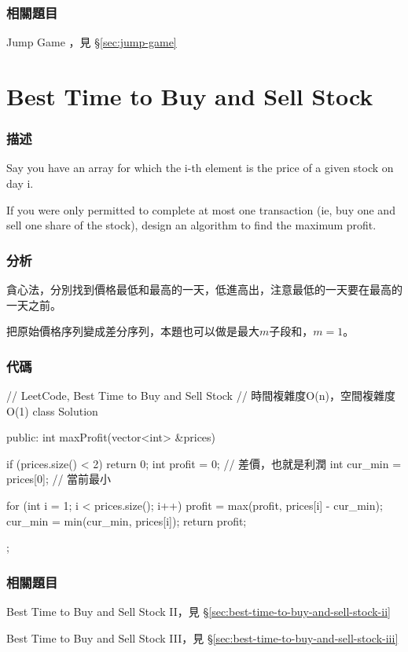\subsubsection{相關題目}
\begindot
\item Jump Game ，見 \S \ref{sec:jump-game}
\myenddot


\section{Best Time to Buy and Sell Stock} %
\label{sec:best-time-to-buy-and-sell-stock}


\subsubsection{描述}
Say you have an array for which the i-th element is the price of a given stock on day i.

If you were only permitted to complete at    most one transaction (ie, buy one and sell one share of the stock), design an algorithm to find the maximum profit.


\subsubsection{分析}
貪心法，分別找到價格最低和最高的一天，低進高出，注意最低的一天要在最高的一天之前。

把原始價格序列變成差分序列，本題也可以做是最大$m$子段和，$m=1$。

\subsubsection{代碼}
\begin{Code}
// LeetCode, Best Time to Buy and Sell Stock
// 時間複雜度O(n)，空間複雜度O(1)
class Solution {
public:
    int maxProfit(vector<int> &prices) {
        if (prices.size() < 2) return 0;
        int profit = 0;  // 差價，也就是利潤
        int cur_min = prices[0]; // 當前最小

        for (int i = 1; i < prices.size(); i++) {
            profit = max(profit, prices[i] - cur_min);
            cur_min = min(cur_min, prices[i]);
        }
        return profit;
    }
};
\end{Code}


\subsubsection{相關題目}
\begindot
\item Best Time to Buy and Sell Stock II，見 \S \ref{sec:best-time-to-buy-and-sell-stock-ii}
\item Best Time to Buy and Sell Stock III，見 \S \ref{sec:best-time-to-buy-and-sell-stock-iii}
\myenddot


